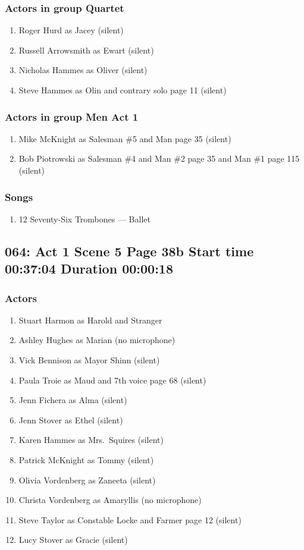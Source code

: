 \subsubsection{Actors in group Quartet}
\begin{enumerate}
\item Roger Hurd as Jacey (silent)
\item Russell Arrowsmith as Ewart (silent)
\item Nicholas Hammes as Oliver (silent)
\item Steve Hammes as Olin and contrary solo page 11 (silent)
\end{enumerate}
\subsubsection{Actors in group Men Act 1}
\begin{enumerate}
\item Mike McKnight as Salesman \#5 and Man page 35 (silent)
\item Bob Piotrowski as Salesman \#4 and Man \#2 page 35 and Man \#1 page 115 (silent)
\end{enumerate}

\subsubsection{Songs}
\begin{enumerate}
\item 12 Seventy-Six Trombones --- Ballet
\end{enumerate}
\subsection{064: Act 1 Scene 5 Page 38b Start time 00:37:04 Duration 00:00:18}

\subsubsection{Actors}
\begin{enumerate}
\item Stuart Harmon as Harold and Stranger
\item Ashley Hughes as Marian (no microphone)
\item Vick Bennison as Mayor Shinn (silent)
\item Paula Troie as Maud and 7th voice page 68 (silent)
\item Jenn Fichera as Alma (silent)
\item Jenn Stover as Ethel (silent)
\item Karen Hammes as Mrs.~Squires (silent)
\item Patrick McKnight as Tommy (silent)
\item Olivia Vordenberg as Zaneeta (silent)
\item Christa Vordenberg as Amaryllis (no microphone)
\item Steve Taylor as Constable Locke and Farmer page 12 (silent)
\item Lucy Stover as Gracie (silent)
\end{enumerate}

